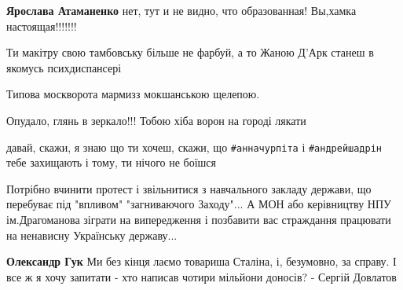 \begin{itemize}
\begin{itemize}
\textbf{Ярослава Атаманенко} нет, тут и не видно, что образованная! Вы,хамка настоящая!!!!!!!
\end{itemize}

 
Ти макітру свою тамбовську більше не фарбуй, а то Жаною Д'Арк станеш в якомусь
психдиспансері\Laughey[1.0][white]

 
Типова москворота мармизз мокшанською щелепою.

 
Опудало, глянь в зеркало!!!
Тобою хіба ворон на городі лякати🤣

 
давай, скажи, я знаю що ти хочеш, скажи, що \verb|#анначурпіта| і \verb|#андрейшадрін| тебе захищають і тому, ти нічого не боїшся

 

Потрібно вчинити протест і звільнитися з навчального закладу держави, що
перебуває під "впливом" "загниваючого Заходу"... А МОН або керівництву НПУ
ім.Драгоманова зіграти на випередження і позбавити вас страждання працювати на
ненависну Українську державу...

\begin{itemize}
 
\textbf{Олександр Гук}
Ми без кінця лаємо товариша Сталіна, і, безумовно, за справу. І все ж я хочу запитати - хто написав чотири мільйони доносів?
- Сергій Довлатов

 

\end{itemize}
\end{itemize}
